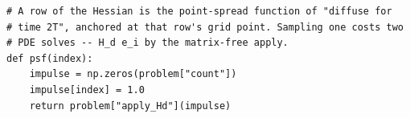 \begin{verbatim}
# A row of the Hessian is the point-spread function of "diffuse for
# time 2T", anchored at that row's grid point. Sampling one costs two
# PDE solves -- H_d e_i by the matrix-free apply.
def psf(index):
    impulse = np.zeros(problem["count"])
    impulse[index] = 1.0
    return problem["apply_Hd"](impulse)
\end{verbatim}
